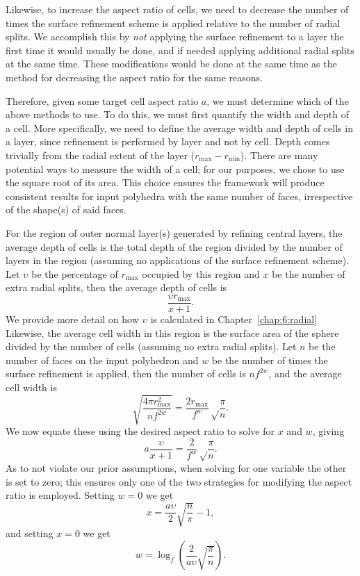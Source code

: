 Likewise, to increase the aspect ratio of cells, we need to decrease the number of times the surface refinement scheme is applied relative to the number of radial splits.
We accomplish this by \textit{not} applying the surface refinement to a layer the first time it would usually be done, and if needed applying additional radial splits at the same time.
These modifications would be done at the same time as the method for decreasing the aspect ratio for the same reasons.


Therefore, given some target cell aspect ratio $a$, we must determine which of the above methods to use.
To do this, we must first quantify the width and depth of a cell.
More specifically, we need to define the average width and depth of cells in a layer, since refinement is performed by layer and not by cell.
Depth comes trivially from the radial extent of the layer ($r_\mathrm{max} - r_\mathrm{min}$).
There are many potential ways to measure the width of a cell; for our purposes, we chose to use the square root of its area.
This choice ensures the framework will produce consistent results for input polyhedra with the same number of faces, irrespective of the shape(s) of said faces.


For the region of outer normal layer(s) generated by refining central layers, the average depth of cells is the total depth of the region divided by the number of layers in the region (assuming no applications of the surface refinement scheme).
Let $\upsilon$ be the percentage of $r_\mathrm{max}$ occupied by this region and $x$ be the number of extra radial splits, then the average depth of cells is
%
\begin{equation*}
\frac{\upsilon r_\mathrm{max}}{x+1}.
\end{equation*}
%
We provide more detail on how $\upsilon$ is calculated in Chapter~\ref{chap:6:radial} 
Likewise, the average cell width in this region is the surface area of the sphere divided by the number of cells (assuming no extra radial splits).
Let $n$ be the number of faces on the input polyhedron and $w$ be the number of times the surface refinement is applied, then the number of cells is $n f^{2w}$, and the average cell width is
%
\begin{equation*}
\sqrt{ \frac{ 4 \pi r_\mathrm{max}^2 }{ n f^{2 w} } } = \frac{2 r_\mathrm{max}}{f^w} \sqrt\frac{\pi}{n}.
\end{equation*}
%
We now equate these using the desired aspect ratio to solve for $x$ and $w$, giving
%
\begin{equation*}
a \frac{\upsilon}{x+1} = \frac{2}{f^w} \sqrt\frac{\pi}{n}.
\end{equation*}
%
As to not violate our prior assumptions, when solving for one variable the other is set to zero; this ensures only one of the two strategies for modifying the aspect ratio is employed.
Setting $w = 0$ we get
%
\begin{equation}
x = \frac{a \upsilon}{2} \sqrt{\frac{n}{\pi}} - 1,
\label{eq:extraSplits}
\end{equation}
%
and setting $x = 0$ we get
%
\begin{equation}
w = \log_{f} \left( \frac{2}{a \upsilon} \sqrt{ \frac{\pi}{n}} \right).
\label{eq:num2D}
\end{equation}


